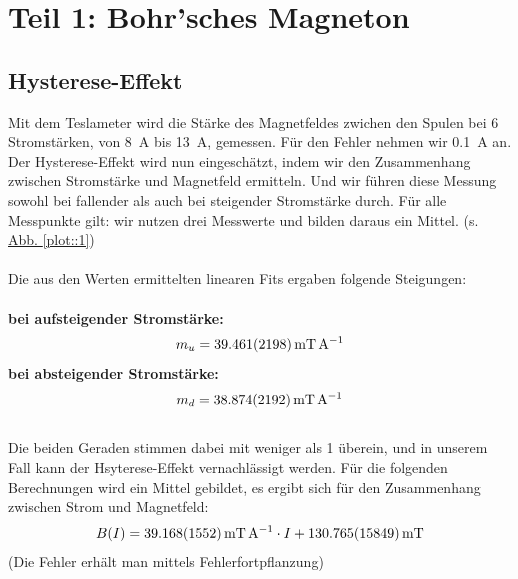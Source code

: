 \section{Teil 1: Bohr'sches Magneton}
  \subsection{Hysterese-Effekt}
    Mit dem Teslameter wird die Stärke des Magnetfeldes zwichen den Spulen bei 6 Stromstärken, von \SI{8}{\ampere} bis \SI{13}{\ampere}, gemessen. Für den Fehler nehmen wir \SI{0.1}{\ampere} an. Der Hysterese-Effekt wird nun eingeschätzt, indem wir den Zusammenhang zwischen Stromstärke und Magnetfeld ermitteln. Und wir führen diese Messung sowohl bei fallender als auch bei steigender Stromstärke durch. Für alle Messpunkte gilt: wir nutzen drei Messwerte und bilden daraus ein Mittel. (s. \hyperref[plot::1]{Abb. \ref*{plot::1}})\\\\
    Die aus den Werten ermittelten linearen Fits ergaben folgende Steigungen:\\\\
    \textbf{bei aufsteigender Stromstärke:}
      \begin{align}
        m_u = \SI{39.461+-2.198}{\milli\tesla\per\ampere}
      \end{align}
    \textbf{bei absteigender Stromstärke:}
      \begin{align}
        m_d = \SI{38.874+-2.192}{\milli\tesla\per\ampere}
      \end{align}\\
    Die beiden Geraden stimmen dabei mit weniger als \SI{1}{\sigma} überein, und in unserem Fall kann der Hsyterese-Effekt vernachlässigt werden. Für die folgenden Berechnungen wird ein Mittel gebildet, es ergibt sich für den Zusammenhang zwischen Strom und Magnetfeld:
    \begin{align}
      B(I) = \SI{39.168+-1.552}{\milli\tesla\per\ampere} \cdot I + \SI{130.765+-15.849}{\milli\tesla}
    \end{align}
    (Die Fehler erhält man mittels Fehlerfortpflanzung)

